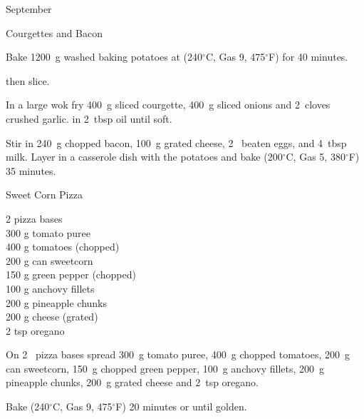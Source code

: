 \begin{menu}{September}
\begin{recipe}{2}{Courgettes and Bacon}
\begin{ingredients}
		\end{ingredients}
	
	
    \begin{instructions}
    \item 
    Bake
    1200~g washed baking potatoes
    at
    (240$^{\circ}$C, Gas 9, 475$^{\circ}$F) for 40 minutes.
  
        then slice.
      \item 
        In a large wok fry
        400~g sliced courgette,
        400~g sliced onions
        and
        2~cloves crushed garlic.
        in
        2~tbsp  oil
        until soft.
      \item 
        Stir in
        240~g chopped bacon,
        100~g grated cheese,
        2~ beaten eggs,
        and
        4~tbsp  milk.
        Layer in a casserole dish
        with the potatoes
        and bake (200$^{\circ}$C, Gas 5, 380$^{\circ}$F) 35 minutes.
      
    \end{instructions}
    \end{recipe}%
  
    \begin{recipe}{2}{Sweet Corn Pizza}%
		\begin{ingredients}
		2  pizza bases  \\
	300 g tomato puree  \\
	400 g tomatoes (chopped) \\
	200 g can sweetcorn  \\
	150 g green pepper (chopped) \\
	100 g anchovy fillets  \\
	200 g pineapple chunks  \\
	200 g cheese (grated) \\
	2 tsp oregano  \\
	
		\end{ingredients}
	
	
	
    \begin{instructions}
    \item 
        On
        2~  pizza bases
        spread
        300~g  tomato puree,
        400~g chopped tomatoes,
        200~g  can sweetcorn,
        150~g chopped green pepper,
        100~g  anchovy fillets,
        200~g  pineapple chunks,
        200~g grated cheese
        and
        2~tsp  oregano.
      \item 
        Bake (240$^{\circ}$C, Gas 9, 475$^{\circ}$F) 20 minutes or until golden.
      

\end{instructions}
\end{recipe}
\end{menu}
